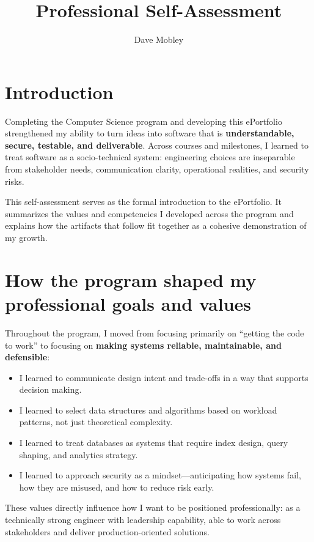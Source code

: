 \documentclass[12pt,stu]{apa7}
\title{Professional Self-Assessment}
\author{Dave Mobley}
\affiliation{Southern New Hampshire University}
\begin{document}
\maketitle

\section*{Introduction}

Completing the Computer Science program and developing this ePortfolio strengthened my ability to turn ideas into software that is \textbf{understandable, secure, testable, and deliverable}. Across courses and milestones, I learned to treat software as a socio-technical system: engineering choices are inseparable from stakeholder needs, communication clarity, operational realities, and security risks.

This self-assessment serves as the formal introduction to the ePortfolio. It summarizes the values and competencies I developed across the program and explains how the artifacts that follow fit together as a cohesive demonstration of my growth.

\section*{How the program shaped my professional goals and values}

Throughout the program, I moved from focusing primarily on \enquote{getting the code to work} to focusing on \textbf{making systems reliable, maintainable, and defensible}:

\begin{itemize}
  \item I learned to communicate design intent and trade-offs in a way that supports decision making.
  \item I learned to select data structures and algorithms based on workload patterns, not just theoretical complexity.
  \item I learned to treat databases as systems that require index design, query shaping, and analytics strategy.
  \item I learned to approach security as a mindset---anticipating how systems fail, how they are misused, and how to reduce risk early.
\end{itemize}

These values directly influence how I want to be positioned professionally: as a technically strong engineer with leadership capability, able to work across stakeholders and deliver production-oriented solutions.
\end{document}
